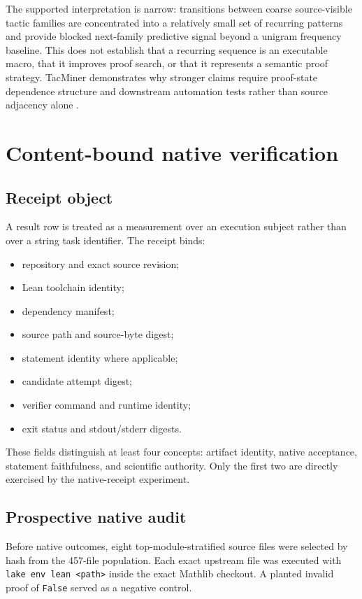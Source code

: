 \documentclass[11pt]{article}
\begin{document}
The supported interpretation is narrow: transitions between coarse source-visible tactic families are concentrated into a relatively small set of recurring patterns and provide blocked next-family predictive signal beyond a unigram frequency baseline. This does not establish that a recurring sequence is an executable macro, that it improves proof search, or that it represents a semantic proof strategy. TacMiner demonstrates why stronger claims require proof-state dependence structure and downstream automation tests rather than source adjacency alone \cite{xin2025tacminer}.

\section{Content-bound native verification}
\subsection{Receipt object}
A result row is treated as a measurement over an execution subject rather than over a string task identifier. The receipt binds:
\begin{itemize}[leftmargin=*]
\item repository and exact source revision;
\item Lean toolchain identity;
\item dependency manifest;
\item source path and source-byte digest;
\item statement identity where applicable;
\item candidate attempt digest;
\item verifier command and runtime identity;
\item exit status and stdout/stderr digests.
\end{itemize}

These fields distinguish at least four concepts: artifact identity, native acceptance, statement faithfulness, and scientific authority. Only the first two are directly exercised by the native-receipt experiment.

\subsection{Prospective native audit}
Before native outcomes, eight top-module-stratified source files were selected by hash from the 457-file population. Each exact upstream file was executed with \texttt{lake env lean <path>} inside the exact Mathlib checkout. A planted invalid proof of \texttt{False} served as a negative control.
\end{document}
